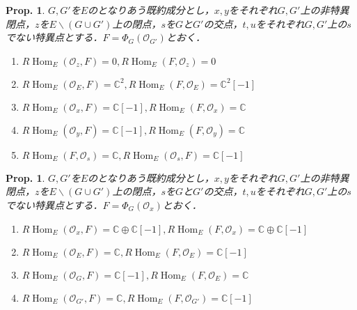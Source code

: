 \documentclass[uplatex,a4paper,11pt,dvipdfmx]{jsarticle}
\theoremstyle{mystyle} %
\newtheorem{proposition}[theorem]{Prop.}
\DeclareMathOperator{\Hom}{Hom}
\begin{document}
\begin{proposition}
	$G, G'$を$E$のとなりあう既約成分とし，$x,y$をそれぞれ$G, G'$上の非特異閉点，$z$を$E \backslash (G \cup G')$上の閉点，$s$を$G$と$G'$の交点，$t, u$をそれぞれ$G, G'$上の$s$でない特異点とする．$F = \Phi_G(\mathcal{O}_{G'})$とおく．
	\begin{enumerate}
		\item $R\Hom_E(\mathcal{O}_z, F) = 0, R\Hom_E(F,\mathcal{O}_z)=0$
		\item $R\Hom_E(\mathcal{O}_E, F) = \mathbb{C}^2, R\Hom_E(F,\mathcal{O}_E)=\mathbb{C}^2[-1]$
		\item $R\Hom_E(\mathcal{O}_x, F) = \mathbb{C}[-1], R\Hom_E(F,\mathcal{O}_x)=\mathbb{C}$
		\item $R\Hom_E(\mathcal{O}_y, F) = \mathbb{C}[-1], R\Hom_E(F,\mathcal{O}_y)=\mathbb{C}$
		\item $R\Hom_E(F, \mathcal{O}_s) =\mathbb{C}, R\Hom_E( \mathcal{O}_s, F) =\mathbb{C}[-1]$
	\end{enumerate}
\end{proposition}
\begin{proposition}
	$G, G'$を$E$のとなりあう既約成分とし，$x,y$をそれぞれ$G, G'$上の非特異閉点，$z$を$E \backslash (G \cup G')$上の閉点，$s$を$G$と$G'$の交点，$t, u$をそれぞれ$G, G'$上の$s$でない特異点とする．$F = \Phi_G(\mathcal{O}_x)$とおく．
	\begin{enumerate}
		\item $R\Hom_E(\mathcal{O}_x, F) = \mathbb{C} \oplus \mathbb{C}[-1],R\Hom_E(F, \mathcal{O}_x) = \mathbb{C} \oplus \mathbb{C}[-1]$
		\item $R\Hom_E(\mathcal{O}_E, F) = \mathbb{C} ,R\Hom_E(F, \mathcal{O}_E) = \mathbb{C}[-1]$
		\item $R\Hom_E(\mathcal{O}_G, F) = \mathbb{C}[-1] ,R\Hom_E(F, \mathcal{O}_E) = \mathbb{C}$
		\item $R\Hom_E(\mathcal{O}_{G'}, F) = \mathbb{C} ,R\Hom_E(F, \mathcal{O}_{G'}) = \mathbb{C}[-1]$
	\end{enumerate}
\end{proposition}
\end{document}
